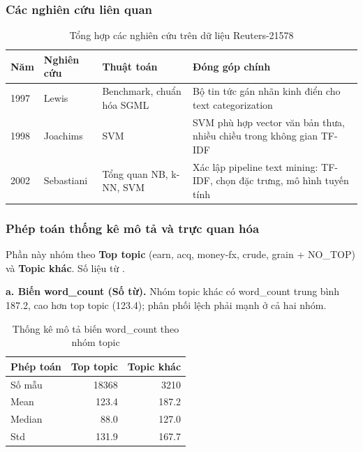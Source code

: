 \subsubsection{Các nghiên cứu liên quan}

\begin{table}[H]
\centering
\caption{Tổng hợp các nghiên cứu trên dữ liệu Reuters-21578}
\label{tab:reuters_research_review}
\small
\begin{tabular}{p{}p{}p{}p{}}
\toprule
Năm & Nghiên cứu & Thuật toán & Đóng góp chính \\
\midrule
1997 & Lewis \cite{Lewis1997Reuters} & Benchmark, chuẩn hóa SGML & Bộ tin tức gán nhãn kinh điển cho text categorization \\
1998 & Joachims \cite{Joachims1998TextSVM} & SVM & SVM phù hợp vector văn bản thưa, nhiều chiều trong không gian TF-IDF \\
2002 & Sebastiani \cite{Sebastiani2002TextCategorization} & Tổng quan NB, k-NN, SVM & Xác lập pipeline text mining: TF-IDF, chọn đặc trưng, mô hình tuyến tính \\
\bottomrule
\end{tabular}
\end{table}

\subsubsection{Phép toán thống kê mô tả và trực quan hóa}

Phần này nhóm theo \textbf{Top topic} (earn, acq, money-fx, crude, grain + NO\_TOP) và \textbf{Topic khác}. Số liệu từ .

\textbf{a. Biến word\_count (Số từ).} Nhóm topic khác có word\_count trung bình 187.2, cao hơn top topic (123.4); phân phối lệch phải mạnh ở cả hai nhóm.

\begin{table}[H]
\centering
\caption{Thống kê mô tả biến word\_count theo nhóm topic}
\label{tab:reuters_wordcount_stats}
\small
\begin{tabular}{lrr}
\toprule
Phép toán & Top topic & Topic khác \\
\midrule
Số mẫu & 18368 & 3210 \\
Mean & 123.4 & 187.2 \\
Median & 88.0 & 127.0 \\
Std & 131.9 & 167.7 \\
\bottomrule
\end{tabular}
\end{table}

